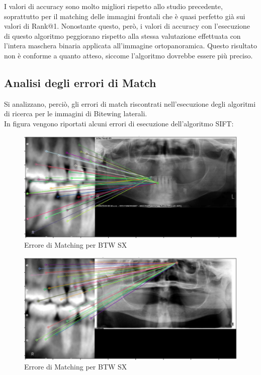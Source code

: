 \documentclass[12pt,a4paper,openright,twoside]{book}
\begin{document}
I valori di accuracy sono molto migliori rispetto allo studio precedente, soprattutto per il matching delle immagini frontali che è quasi perfetto già sui valori di Rank@1. Nonostante questo, però, i valori di accuracy con l'esecuzione di questo algoritmo peggiorano rispetto alla stessa valutazione effettuata con l'intera maschera binaria applicata all'immagine ortopanoramica. Questo risultato non è conforme a quanto atteso, siccome l'algoritmo dovrebbe essere più preciso.

\subsection{Analisi degli errori di Match}
Si analizzano, perciò, gli errori di match riscontrati nell'esecuzione degli algoritmi di ricerca per le immagini di Bitewing laterali.\\
In figura vengono riportati alcuni errori di esecuzione dell'algoritmo SIFT:
\begin{figure}[H]
	\centering
	\includegraphics[width=15cm]{figures/matcherr.pdf}
   	\caption{Errore di Matching per BTW SX}
	\label{fig:matcherr}
\end{figure}
\begin{figure}[H]
	\centering
	\includegraphics[width=15cm]{figures/matcherr2.pdf}
    	\caption{Errore di Matching per BTW SX}
	\label{fig:matcherr2}
\end{figure}
\end{document}
